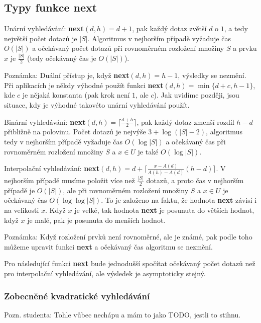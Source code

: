 \documentclass[a4paper,12pt]{article}
\begin{document}
\subsection{Typy funkce {\bf next}}

Unární vyhledávání: {\bf next$(d,h)=d+1$}, pak každý 
dotaz zvětší $d$ o $1$, a tedy největší počet 
dotazů je $|S|$. Algoritmus v nej\-horším případě 
vyžaduje čas $O(|S|)$ a očekávaný počet dotazů při 
rovnoměrném rozložení množiny $S$ a prvku $x$ je $\frac {
|S|}2$ 
(tedy očekávaný čas je $O(|S|)$). 

Poznámka: Duální přístup je, když 
{\bf next$(d,h)=h-1$}, výsled\-ky se nezmění. Při aplikacích je 
někdy výhodné použít funkci {\bf next$(d,h)=\min\{d
+c,h-1\}$}, 
kde $c$ je nějaká konstanta (pak krok není $1$, ale $c$). Jak 
uvidíme později, jsou situace, kdy je výhodné  
takovéto unární vyhledávání použít.

Binární vyhledávání: {\bf next$(d,h)=\lceil\frac {
d+h}2\rceil$}, pak 
každý dotaz zmenší rozdíl $h-d$ přibližně na polovinu. 
Počet dotazů je nejvýše $3+\log(|S|-2)$, 
algoritmus tedy v 
nejhorším případě vyžaduje čas $O(\log|S|)$ a  
očekávaný čas při rovnoměrném roz\-ložení množiny $
S$ a 
$x\in U$ je také $O(\log|S|)$.

Interpolační vyhledávání: 
{\bf next$(d,h)=d+\lceil\frac {x-A(d)}{A(h)-A(d)}(h-d)\rceil$}. V nejhorším případě 
musíme položit více než $\frac {|S|}2$ dotazů, a proto čas 
v nejhorším případě je $O(|S|)$, ale při rovnoměrném 
roz\-ložení množiny $S$ a $x\in U$ je očekávaný čas 
$O(\log\log|S|)$. To je založeno na faktu, že hodnota {\bf next }
závisí i na velikosti $x$. Když $x$ je velké, tak hodnota 
{\bf next} je posunuta do větších hodnot, když $x$ je malé, 
pak je posunuta do menších hodnot.

Poznámka: Když rozložení prvků není 
rovnoměrné, ale je zná\-mé, pak podle toho můžeme  
upravit funkci {\bf next} a očekávaný čas algoritmu se 
nezmění.

Pro následující funkci {\bf next} bude 
jednodušší spočítat očekáva\-ný počet dotazů než 
pro interpolační vyhledávání, ale výsledek je 
asymptoticky stejný.

\subsubsection{Zobecněné kvadratické vyhledávání}

Pozn. studenta: Tohle vůbec nechápu a mám to jako TODO, jestli to stihnu.
\end{document}
